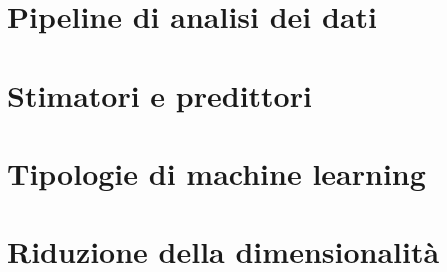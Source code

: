 \documentclass{article}
\begin{document}
\newgeometry{}

\tableofcontents

\section{Pipeline di analisi dei dati}


\section{Stimatori e predittori}


\section{Tipologie di machine learning}


\section{Riduzione della dimensionalità}

\end{document}
